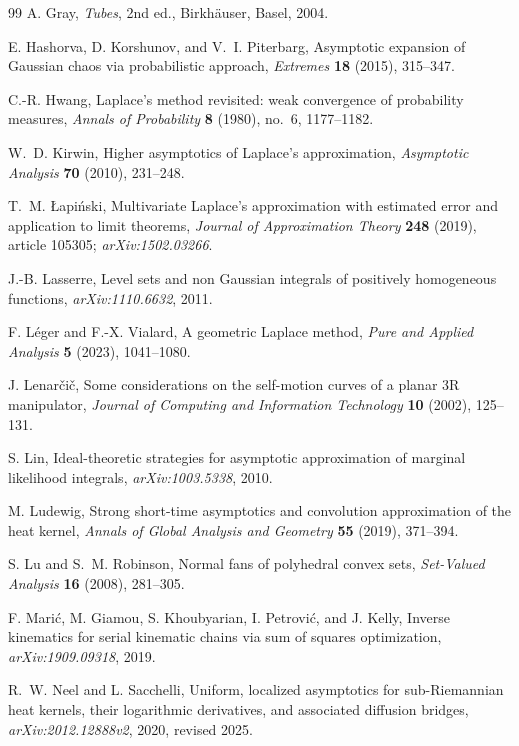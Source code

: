 \documentclass[11pt]{amsart}
\numberwithin{equation}{section}
\theoremstyle{definition}
\theoremstyle{remark}
\begin{document}
\begin{thebibliography}{99}
A. Gray,
\emph{Tubes}, 2nd ed.,
Birkh\"auser, Basel, 2004.

E. Hashorva, D. Korshunov, and V.~I. Piterbarg,
Asymptotic expansion of Gaussian chaos via probabilistic approach,
\emph{Extremes} \textbf{18} (2015), 315--347.

C.-R. Hwang,
Laplace's method revisited: weak convergence of probability measures,
\emph{Annals of Probability} \textbf{8} (1980), no.~6, 1177--1182.

W.~D. Kirwin,
Higher asymptotics of Laplace's approximation,
\emph{Asymptotic Analysis} \textbf{70} (2010), 231--248.

T.~M. \L{}api\'nski,
Multivariate Laplace's approximation with estimated error and application to
limit theorems,
\emph{Journal of Approximation Theory} \textbf{248} (2019), article 105305;
\emph{arXiv:1502.03266}.

J.-B. Lasserre,
Level sets and non Gaussian integrals of positively homogeneous functions,
\emph{arXiv:1110.6632}, 2011.

F. L\'eger and F.-X. Vialard,
A geometric Laplace method,
\emph{Pure and Applied Analysis} \textbf{5} (2023), 1041--1080.

J. Lenar\v{c}i\v{c},
Some considerations on the self-motion curves of a planar 3R manipulator,
\emph{Journal of Computing and Information Technology} \textbf{10} (2002),
125--131.

S. Lin,
Ideal-theoretic strategies for asymptotic approximation of marginal likelihood
integrals,
\emph{arXiv:1003.5338}, 2010.

M. Ludewig,
Strong short-time asymptotics and convolution approximation of the heat kernel,
\emph{Annals of Global Analysis and Geometry} \textbf{55} (2019), 371--394.

S. Lu and S.~M. Robinson,
Normal fans of polyhedral convex sets,
\emph{Set-Valued Analysis} \textbf{16} (2008), 281--305.

F. Mari\'c, M. Giamou, S. Khoubyarian, I. Petrovi\'c, and J. Kelly,
Inverse kinematics for serial kinematic chains via sum of squares optimization,
\emph{arXiv:1909.09318}, 2019.

R.~W. Neel and L. Sacchelli,
Uniform, localized asymptotics for sub-Riemannian heat kernels, their
logarithmic derivatives, and associated diffusion bridges,
\emph{arXiv:2012.12888v2}, 2020, revised 2025.


\end{thebibliography}
\end{document}
